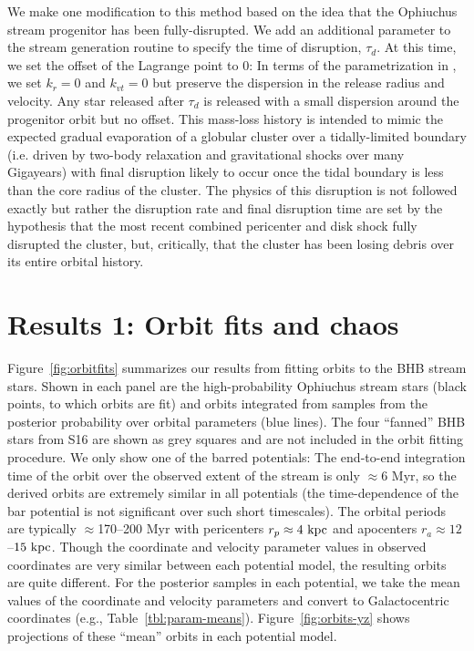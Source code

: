 We make one modification to this method based on the idea that the Ophiuchus
stream progenitor has been fully-disrupted. We add an additional parameter to
the stream generation routine to specify the time of disruption, $\tau_d$. At
this time, we set the offset of the Lagrange point to 0: In terms of the
parametrization in \citep{fardal14}, we set $k_r = 0$ and $k_{vt}=0$ but
preserve the dispersion in the release radius and velocity. Any star released
after $\tau_d$ is released with a small dispersion around the progenitor orbit
but no offset. This mass-loss history is intended to mimic the expected gradual
evaporation of a globular cluster over a tidally-limited boundary (i.e. driven
by two-body relaxation and gravitational shocks over many Gigayears) with final
disruption likely to occur once the tidal boundary is less than the core radius
of the cluster. The physics of this disruption is not followed exactly but
rather the disruption rate and final disruption time are set by the hypothesis
that the most recent combined pericenter and disk shock fully disrupted the
cluster, but, critically, that the cluster has been losing debris over its
entire orbital history.

\section{Results 1: Orbit fits and chaos}\label{sec:ch5-results1}

Figure~\ref{fig:orbitfits} summarizes our results from fitting orbits to the BHB
stream stars. Shown in each panel are the high-probability Ophiuchus stream
stars (black points, to which orbits are fit) and orbits integrated from samples
from the posterior probability over orbital parameters (blue lines). The four
``fanned'' BHB stars from S16 are shown as grey squares and are not included in
the orbit fitting procedure. We only show one of the barred potentials: The
end-to-end integration time of the orbit over the observed extent of the stream
is only $\approx$6 Myr, so the derived orbits are extremely similar in all
potentials (the time-dependence of the bar potential is not significant over
such short timescales). The orbital periods are typically $\approx$170--200 Myr
with pericenters $r_p \approx 4~{\rm kpc}$ and apocenters $r_a \approx
12$--$15~{\rm kpc}$. Though the coordinate and velocity parameter values in
observed coordinates are very similar between each potential model, the
resulting orbits are quite different. For the posterior samples in each
potential, we take the mean values of the coordinate and velocity parameters and
convert to Galactocentric coordinates (e.g., Table~\ref{tbl:param-means}).
Figure~\ref{fig:orbits-yz} shows projections of these ``mean'' orbits in each
potential model.


